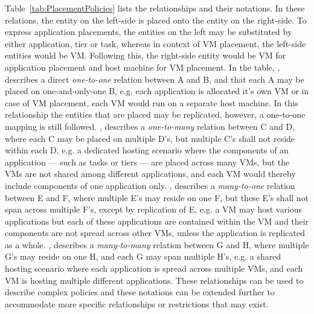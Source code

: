 \documentclass[10pt,journal,cspaper,compsoc]{IEEEtran}
\begin{document}
Table~\ref{tab:PlacementPolicies} lists the relationships and their notations. In these relations, the entity on the left-side is placed onto the entity on the right-side. To express application placements, the entities on the left may be substituted by either application, tier or task, whereas in context of VM placement, the left-side entities would be VM. Following this, the right-side entity would be VM for application placement and host machine for VM placement. In the table, , describes a  direct \emph{one-to-one} relation between A and B, and that each A may be placed on one-and-only-one B, e.g. each application is allocated it's own VM or in case of VM placement, each VM would run on a separate host machine. In this relationship the entities that are placed may be replicated, however, a one-to-one mapping is still followed. , describes a \emph{one-to-many} relation between C and D, where each C may be placed on multiple D's, but multiple C's shall not reside within each D, e.g. a dedicated hosting scenario where the components of an application --- such as tasks or tiers --- are placed across many VMs, but the VMs are not shared among different applications, and each VM would thereby include components of one application only. , describes a \emph{many-to-one} relation between E and F, where multiple E's may reside on one F, but these E's shall not span across multiple F's, except by replication of E, e.g. a VM may host various applications but each of these applications are contained within the VM and their components are not spread across other VMs, unless the application is replicated as a whole. , describes a \emph{many-to-many} relation between G and H, where multiple G's may reside on one H, and each G may span multiple H's, e.g. a shared hosting scenario where each application is spread across multiple VMs, and each VM is hosting multiple different applications. These relationships can be used to describe complex policies and these notations can be extended further to accommodate more specific relationships or restrictions that may exist.
\end{document}
